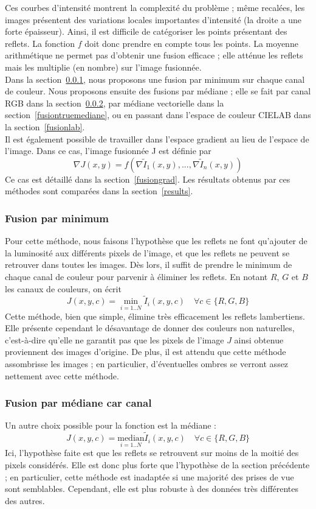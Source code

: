 \documentclass[12pt,a4paper]{article}
\begin{document}
Ces courbes d'intensité montrent la complexité du problème ; même recalées, les images présentent des variations locales importantes d'intensité (la droite a une forte épaisseur). Ainsi, il est difficile de catégoriser les points présentant des reflets. La fonction $f$ doit donc prendre en compte tous les points. La moyenne arithmétique ne permet pas d'obtenir une fusion efficace ; elle atténue les reflets mais les multiplie (en nombre) sur l'image fusionnée.\\
Dans la section~\ref{fusionmin}, nous proposons une fusion par minimum sur chaque canal de couleur. Nous proposons ensuite des fusions par médiane ; elle se fait par canal RGB dans la section~\ref{fusionmediane}, par médiane vectorielle dans la section~\ref{fusiontruemediane}, ou en passant dans l'espace de couleur CIELAB dans la section~\ref{fusionlab}.\\
Il est également possible de travailler dans l'espace gradient au lieu de l'espace de l'image. Dans ce cas, l'image fusionnée J est définie par
\[
\nabla J(x,y)=f\left(\nabla \tilde I_1(x,y), ..., \nabla \tilde I_n(x,y)\right)
\]
Ce cas est détaillé dans la section~\ref{fusiongrad}. Les résultats obtenus par ces méthodes sont comparées dans la section~\ref{results}.
\subsubsection{Fusion par minimum}
\label{fusionmin}
Pour cette méthode, nous faisons l'hypothèse que les reflets ne font qu'ajouter de la luminosité aux différents pixels de l'image, et que les reflets ne peuvent se retrouver dans toutes les images. Dès lors, il suffit de prendre le minimum de chaque canal de couleur pour parvenir à éliminer les reflets. En notant $R$, $G$ et $B$ les canaux de couleurs, on écrit
\[
J(x,y,c)=\min_{i=1..N}\tilde I_i(x,y,c) \quad \forall c \in \{R,G,B\}
\]
Cette méthode, bien que simple, élimine très efficacement les reflets lambertiens. Elle présente cependant le désavantage de donner des couleurs non naturelles, c'est-à-dire qu'elle ne garantit pas que les pixels de l'image $J$ ainsi obtenue proviennent des images d'origine. De plus, il est attendu que cette méthode assombrisse les images ; en particulier, d'éventuelles ombres se verront assez nettement avec cette méthode.
\subsubsection{Fusion par médiane car canal}
\label{fusionmediane}
Un autre choix possible pour la fonction est la médiane :
\[
J(x,y,c)=\underset{i=1..N}{\mathrm{median}}\tilde I_i(x,y,c) \quad \forall c \in \{R,G,B\}
\]
Ici, l'hypothèse faite est que les reflets se retrouvent sur moins de la moitié des pixels considérés. Elle est donc plus forte que l'hypothèse de la section précédente ; en particulier, cette méthode est inadaptée si une majorité des prises de vue sont semblables. Cependant, elle est plus robuste à des données très différentes des autres. 
\end{document}
